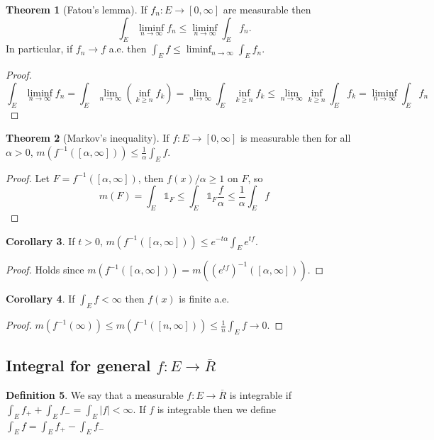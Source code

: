 \documentclass{article}
\newcommand{\cl}[1]{\overline{#1}}
\theoremstyle{definition} %
\newtheorem{thm}{Theorem}
\numberwithin{thm}{section} %
\newtheorem{cor}[thm]{Corollary}
\theoremstyle{definition} %
\newtheorem{defn}[thm]{Definition}
\begin{document}
\begin{thm}[Fatou's lemma]
If $f_n: E \to [0, \infty]$ are measurable then 
\[ \int_E \liminf_{n \to \infty} f_n \leq \liminf_{n \to \infty} \int_E f_n. \]
In particular, if $f_n \to f$ a.e. then $\int_E f \leq \liminf_{n \to \infty} \int_E f_n$.
\end{thm}
\begin{proof}
\[ \int_E \liminf_{n \to \infty} f_n = \int_E \lim_{n \to \infty}\left(\inf_{k \geq n} f_k\right) = \lim_{n \to \infty} \int_E \inf_{k \geq n} f_k \leq \lim_{n \to \infty}\inf_{k \geq n} \int_E f_k = \liminf_{n \to \infty} \int_E f_n \]
\end{proof}

\begin{thm}[Markov's inequality]
If $f: E \to [0, \infty]$ is measurable then for all $\alpha > 0$, $m(f^{-1}([\alpha, \infty])) \leq \frac{1}{\alpha} \int_E f$.
\end{thm}
\begin{proof}
Let $F = f^{-1}([\alpha, \infty])$, then $f(x)/\alpha \geq 1$ on $F$, so 
\[ m(F) = \int_E \mathds{1}_F \leq \int_E \mathds{1}_F \frac{f}{\alpha} \leq \frac{1}{\alpha}\int_E f \]
\end{proof}

\begin{cor}
If $t > 0$, $m(f^{-1}([\alpha, \infty])) \leq e^{-t\alpha}\int_E e^{tf}$.
\end{cor}
\begin{proof}
Holds since $m(f^{-1}([\alpha, \infty])) = m((e^{tf})^{-1}([\alpha, \infty]))$.
\end{proof}

\begin{cor}
If $\int_E f < \infty$ then $f(x)$ is finite a.e.
\end{cor}
\begin{proof}
$m(f^{-1}(\infty)) \leq m(f^{-1}([n, \infty])) \leq \frac{1}{n}\int_E f \to 0$.
\end{proof}

\subsection{Integral for general $f: E \to \cl{R}$}

\begin{defn}
We say that a measurable $f: E \to \cl{R}$ is integrable if $\int_E f_+ + \int_E f_- = \int_E |f| < \infty$. If $f$ is integrable then we define $\int_E f = \int_E f_+ - \int_E f_-$
\end{defn}
\end{document}
